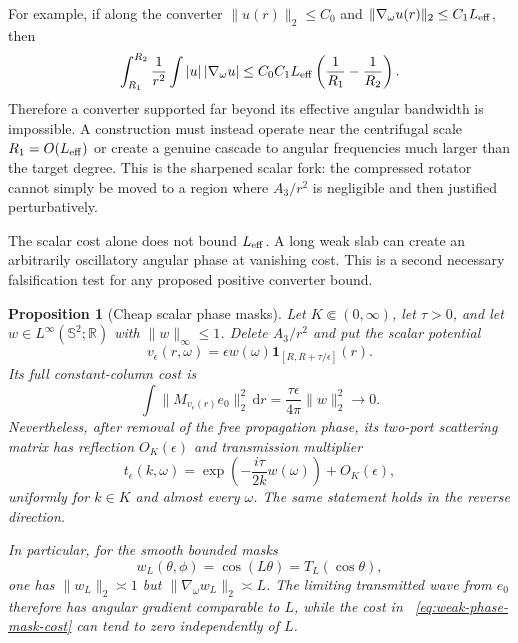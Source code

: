 \documentclass[11pt]{article}
\newcommand{\dd}{\,\mathrm d}
\newtheorem{proposition}[theorem]{Proposition}
\theoremstyle{definition}
\theoremstyle{remark}
\begin{document}
For example, if along the converter
$\|u(r)\|_2\leq C_0$ and
$\|\nabla_\omega u(r)\|_2\leq C_1L_{\rm eff}$, then
\begin{equation}
 \int_{R_1}^{R_2}\frac1{r^2}
   \int|u|\,|\nabla_\omega u|
 \leq C_0C_1L_{\rm eff}
       \left(\frac1{R_1}-\frac1{R_2}\right).
 \label{eq:effective-bandwidth-current}
\end{equation}
Therefore a converter supported far beyond its effective angular bandwidth is
impossible.  A construction must instead operate near the centrifugal scale
$R_1=O(L_{\rm eff})$ or create a genuine cascade to angular frequencies much
larger than the target degree.  This is the sharpened scalar fork: the
compressed rotator cannot simply be moved to a region where $A_3/r^2$ is
negligible and then justified perturbatively.

The scalar cost alone does not bound $L_{\rm eff}$.  A long weak slab can
create an arbitrarily oscillatory angular phase at vanishing cost.  This is a
second necessary falsification test for any proposed positive converter bound.

\begin{proposition}[Cheap scalar phase masks]
\label{prop:cheap-scalar-phase-mask}
Let $K\Subset(0,\infty)$, let $\tau>0$, and let
$w\in L^\infty(\mathbb S^2;\mathbb R)$ with $\|w\|_\infty\leq1$.  Delete
$A_3/r^2$ and put the scalar potential
\begin{equation}
 v_\epsilon(r,\omega)=\epsilon w(\omega)
 \mathbf1_{[R,R+\tau/\epsilon]}(r).
 \label{eq:weak-phase-mask-slab}
\end{equation}
Its full constant-column cost is
\begin{equation}
 \int\|M_{v_\epsilon(r)}e_0\|_2^2\dd r
 =\frac{\tau\epsilon}{4\pi}\|w\|_2^2\longrightarrow0.
 \label{eq:weak-phase-mask-cost}
\end{equation}
Nevertheless, after removal of the free propagation phase, its two-port
scattering matrix has reflection $O_K(\epsilon)$ and transmission multiplier
\begin{equation}
 t_\epsilon(k,\omega)
 =\exp\!\left(-\frac{i\tau}{2k}w(\omega)\right)+O_K(\epsilon),
 \label{eq:weak-phase-mask-limit}
\end{equation}
uniformly for $k\in K$ and almost every $\omega$.  The same statement holds in
the reverse direction.

In particular, for the smooth bounded masks
\begin{equation}
 w_L(\theta,\phi)=\cos(L\theta)=T_L(\cos\theta),
 \label{eq:chebyshev-phase-mask}
\end{equation}
one has $\|w_L\|_2\asymp1$ but
$\|\nabla_\omega w_L\|_2\asymp L$.  The limiting transmitted wave from $e_0$
therefore has angular gradient comparable to $L$, while the cost in
~\eqref{eq:weak-phase-mask-cost} can tend to zero independently of $L$.
\end{proposition}
\end{document}
